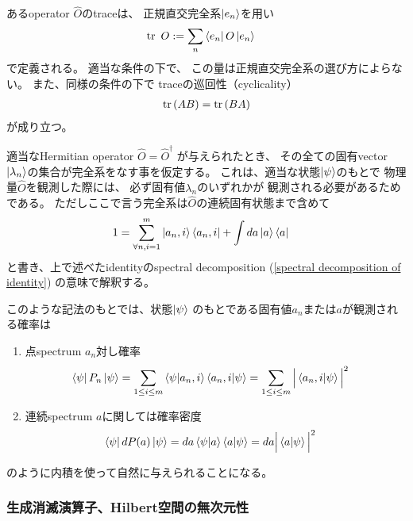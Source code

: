 あるoperator $\hat{O}$のtraceは、
正規直交完全系$\ket{e_n}$を用い
\begin{align}
    \tr\ O
    &:=
    \sum_n\bra{e_n} O \ket{e_n}
\end{align}
で定義される。
適当な条件の下で、
この量は正規直交完全系の選び方によらない。
また、同様の条件の下で
traceの巡回性（cyclicality）
\begin{align}
    \tr\left(
        AB
    \right)
    =
    \tr\left(
        BA
    \right)
\end{align}
が成り立つ。

適当なHermitian operator
$\hat{O} = \hat{O}^\dagger$
が与えられたとき、
その全ての固有vector
$\ket{\lambda_n}$の集合が完全系をなす事を仮定する。
これは、適当な状態$\ket{\psi}$のもとで
物理量$\hat{O}$を観測した際には、
必ず固有値$\lambda_n$のいずれかが
観測される必要があるためである。
ただしここで言う完全系は$\hat{O}$の連続固有状態まで含めて
\begin{align}
    1&=
    \sum_{\forall n,i=1}^m \ket{a_n,i}\bra{a_n,i}
    +
    \int da \ket{a}\bra{a}
\label{complete set of operator eigen vectors}
\end{align}
と書き、上で述べたidentityのspectral decomposition
(\ref{spectral decomposition of identity})
の意味で解釈する。

このような記法のもとでは、状態$\ket{\psi}$
のもとである固有値$a_n$または$a$が観測される確率は
\begin{enumerate}
    \item{点spectrum $a_n$対し確率
    \begin{align}
        \bra{\psi} P_n \ket{\psi}
        &=
            \sum_{1\le i \le m}
        \braket{\psi | a_n,i}
        \braket{a_n,i | \psi}
        =
            \sum_{1\le i \le m}
            \Big|
                \braket{a_n,i | \psi}
            \Big|^2
    \end{align}
    }
    \item{連続spectrum $a$に関しては確率密度
    \begin{align}
        \bra{\psi} d P(a) \ket{\psi}
        &=
        da \braket{\psi | a}\braket{a | \psi}
    =
        da
            \Big|
                \braket{a | \psi}
            \Big|^2
    \end{align}
    }
\end{enumerate}
のように内積を使って自然に与えられることになる。

\subsubsection{生成消滅演算子、Hilbert空間の無次元性}

